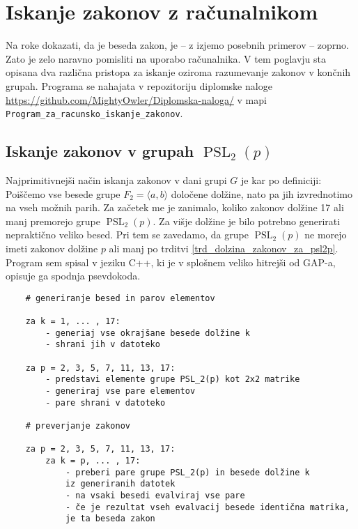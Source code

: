 \section{Iskanje zakonov z računalnikom}
\label{sec_racunalnisko_iskanje}

Na roke dokazati, da je beseda zakon, je -- z izjemo posebnih primerov -- zoprno. 
Zato je zelo naravno pomisliti na uporabo računalnika. 
V tem poglavju sta opisana dva različna pristopa za iskanje  oziroma razumevanje zakonov v končnih grupah. 
Programa se nahajata v repozitoriju diplomske naloge \url{https://github.com/MightyOwler/Diplomska-naloga/} v mapi \texttt{Program\_za\_racunsko\_iskanje\_zakonov}.

\subsection{Iskanje zakonov v grupah $\operatorname{PSL}_2(p)$}\label{sec_iskanje_psl2p}

Najprimitivnejši način iskanja zakonov v dani grupi $G$ je kar po definiciji: Poiščemo vse besede grupe $F_2 = \langle a,b \rangle$ določene dolžine, nato pa jih izvrednotimo na vseh možnih parih.
Za začetek me je zanimalo, koliko zakonov dolžine 17 ali manj premorejo grupe $\operatorname{PSL}_2(p)$. Za višje dolžine je bilo potrebno generirati nepraktično veliko besed. Pri tem se zavedamo, da grupe $\operatorname{PSL}_2(p)$ ne morejo imeti zakonov dolžine $p$ ali manj po trditvi \ref{trd_dolzina_zakonov_za_psl2p}.
Program sem spisal v jeziku C++, ki je v splošnem veliko hitrejši od GAP-a, opisuje ga spodnja psevdokoda.

\begin{verbatim}
    # generiranje besed in parov elementov

    za k = 1, ... , 17:
        - generiaj vse okrajšane besede dolžine k
        - shrani jih v datoteko
    
    za p = 2, 3, 5, 7, 11, 13, 17:
        - predstavi elemente grupe PSL_2(p) kot 2x2 matrike
        - generiraj vse pare elementov
        - pare shrani v datoteko

    # preverjanje zakonov
    
    za p = 2, 3, 5, 7, 11, 13, 17:
        za k = p, ... , 17:
            - preberi pare grupe PSL_2(p) in besede dolžine k 
            iz generiranih datotek
            - na vsaki besedi evalviraj vse pare
            - če je rezultat vseh evalvacij besede identična matrika,
            je ta beseda zakon
\end{verbatim}

